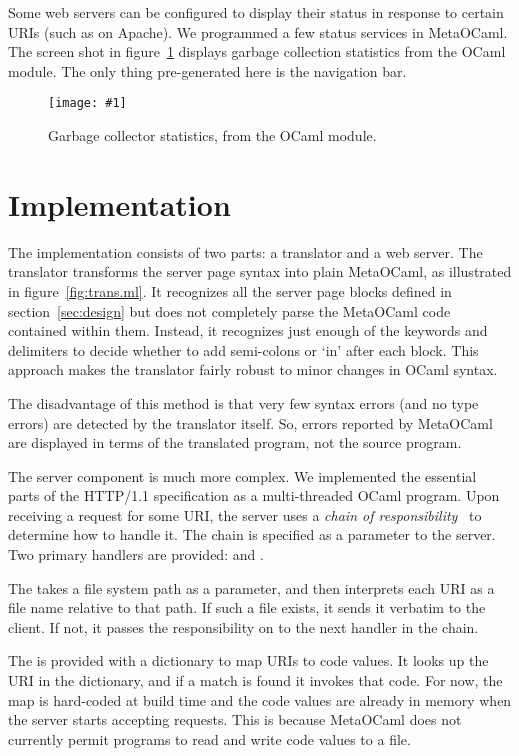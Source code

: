\documentclass{elsart}
\def\MOC{MetaOCaml\xspace}
\newcommand{\myfig}[3]{%
  \begin{figure}[tbp]%
    #3%
    \caption{#2}%
    \label{fig:#1}%
  \end{figure}}
\newcommand{\screenshot}[2]{%
  \myfig{#1}{#2}
  {\centering%
    \texttt{[image: \#1]}}}
\def\lgrindfile#1{
  \par\vskip.5\baselineskip\begingroup
  \begin{lgrind}\relax
  \end{lgrind}\endgroup}
\begin{document}
Some web servers can be configured to display their status in response
to certain URIs (such as  on Apache).  We
programmed a few status services in \MOC.  The screen shot in
figure~\ref{fig:gc} displays garbage collection statistics from the
OCaml  module.  The only thing pre-generated here is the
navigation bar.

\screenshot{gc}{Garbage collector statistics, from the OCaml \id{gc}
  module.}


\section{Implementation}
\label{sec:impl}

The implementation consists of two parts: a translator and a web
server.  The translator transforms the server page syntax into plain
\MOC, as illustrated in figure~\ref{fig:trans.ml}.  It recognizes all
the server page blocks defined in section~\ref{sec:design} but does
not completely parse the \MOC code contained within them.  Instead, it
recognizes just enough of the keywords and delimiters to decide
whether to add semi-colons or `{\KWfont in}' after each block.  This
approach makes the translator fairly robust to minor changes in OCaml
syntax.

The disadvantage of this method is that very few syntax errors (and
no type errors) are detected by the translator itself.  So, errors
reported by \MOC are displayed in terms of the translated program, not
the source program.

The server component is much more complex.  We implemented the
essential parts of the HTTP/1.1 specification as a multi-threaded
OCaml program.  Upon receiving a request for some URI, the server uses
a \emph{chain of responsibility}~\cite{gamma95design} to determine
how to handle it.  The chain is specified as a parameter to the
server.  Two primary handlers are provided:  and
.

The  takes a file system path as a parameter, and then
interprets each URI as a file name relative to that path.  If such a
file exists, it sends it verbatim to the client.  If not, it passes
the responsibility on to the next handler in the chain.

The  is provided with a dictionary to map URIs to code
values.  It looks up the URI in the dictionary, and if a match is
found it invokes that code.  For now, the map is hard-coded at build
time and the code values are already in memory when the server starts
accepting requests.  This is because \MOC does not currently permit
programs to read and write code values to a file.
\end{document}
